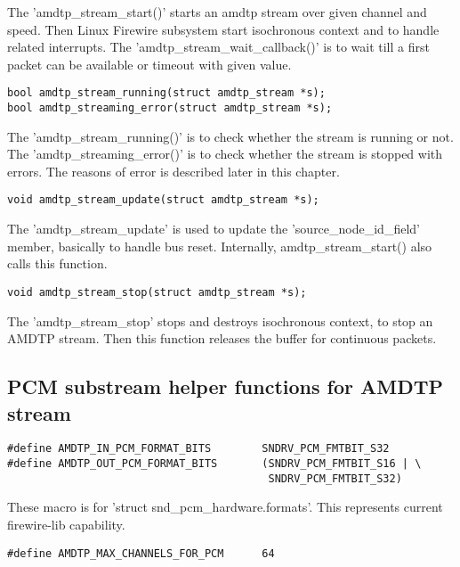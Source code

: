 \documentclass[onecolumn]{jarticle}
\begin{document}
The 'amdtp\_stream\_start()' starts an amdtp stream over given channel and speed. Then Linux Firewire subsystem start isochronous context and to handle related interrupts. The 'amdtp\_stream\_wait\_callback()' is to wait till a first packet can be available or timeout with given value.

\begin{verbatim}
bool amdtp_stream_running(struct amdtp_stream *s);
bool amdtp_streaming_error(struct amdtp_stream *s);
\end{verbatim}

The 'amdtp\_stream\_running()' is to check whether the stream is running or not. The 'amdtp\_streaming\_error()' is to check whether the stream is stopped with errors. The reasons of error is described later in this chapter.

\begin{verbatim}
void amdtp_stream_update(struct amdtp_stream *s);
\end{verbatim}

The 'amdtp\_stream\_update' is used to update the 'source\_node\_id\_field' member, basically to handle bus reset. Internally, amdtp\_stream\_start() also calls this function.

\begin{verbatim}
void amdtp_stream_stop(struct amdtp_stream *s);
\end{verbatim}

The 'amdtp\_stream\_stop' stops and destroys isochronous context, to stop an AMDTP stream. Then this function releases the buffer for continuous packets.

\subsection{PCM substream helper functions for AMDTP stream}

\begin{verbatim}
#define AMDTP_IN_PCM_FORMAT_BITS        SNDRV_PCM_FMTBIT_S32
#define AMDTP_OUT_PCM_FORMAT_BITS       (SNDRV_PCM_FMTBIT_S16 | \
                                         SNDRV_PCM_FMTBIT_S32)
\end{verbatim}

These macro is for 'struct snd\_pcm\_hardware.formats'. This represents current firewire-lib capability.

\begin{verbatim}
#define AMDTP_MAX_CHANNELS_FOR_PCM      64
\end{verbatim}
\end{document}
